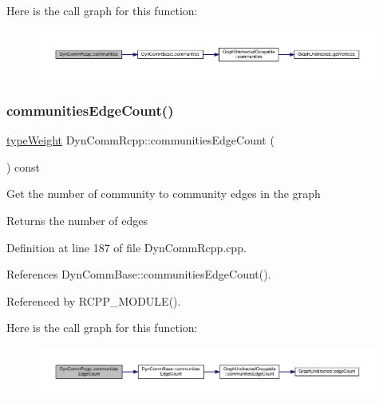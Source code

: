 Here is the call graph for this function\+:
\nopagebreak
\begin{figure}[H]
\begin{center}
\leavevmode
\includegraphics[width=350pt]{classDynCommRcpp_ade6d5c2ebbb13f2efb3988d0d0ac2c1e_cgraph}
\end{center}
\end{figure}
\mbox{\label{classDynCommRcpp_a1a4622783fe2ed76e1c2321204b4b844}} 
\subsubsection{\texorpdfstring{communities\+Edge\+Count()}{communitiesEdgeCount()}}
{\footnotesize\ttfamily \hyperlink{edge_8h_a2e7ea3be891ac8b52f749ec73fee6dd2}{type\+Weight} Dyn\+Comm\+Rcpp\+::communities\+Edge\+Count (\begin{DoxyParamCaption}{ }\end{DoxyParamCaption}) const\hspace{0.3cm}{\ttfamily [inline]}}

Get the number of community to community edges in the graph

\begin{DoxyReturn}{Returns}
the number of edges 
\end{DoxyReturn}


Definition at line 187 of file Dyn\+Comm\+Rcpp.\+cpp.



References Dyn\+Comm\+Base\+::communities\+Edge\+Count().



Referenced by R\+C\+P\+P\+\_\+\+M\+O\+D\+U\+L\+E().

Here is the call graph for this function\+:
\nopagebreak
\begin{figure}[H]
\begin{center}
\leavevmode
\includegraphics[width=350pt]{classDynCommRcpp_a1a4622783fe2ed76e1c2321204b4b844_cgraph}
\end{center}
\end{figure}
\mbox{\label{classDynCommRcpp_ac3c8c1759d2ab106b757557e09834ec5}} 
